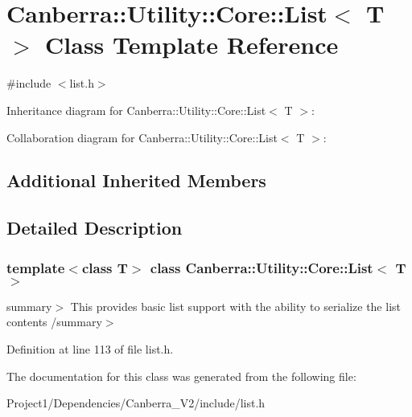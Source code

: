 \hypertarget{class_canberra_1_1_utility_1_1_core_1_1_list}{}\section{Canberra\+:\+:Utility\+:\+:Core\+:\+:List$<$ T $>$ Class Template Reference}
\label{class_canberra_1_1_utility_1_1_core_1_1_list}


{\ttfamily \#include $<$list.\+h$>$}



Inheritance diagram for Canberra\+:\+:Utility\+:\+:Core\+:\+:List$<$ T $>$\+:


Collaboration diagram for Canberra\+:\+:Utility\+:\+:Core\+:\+:List$<$ T $>$\+:
\subsection*{Additional Inherited Members}


\subsection{Detailed Description}
\subsubsection*{template$<$class T$>$\newline
class Canberra\+::\+Utility\+::\+Core\+::\+List$<$ T $>$}

summary$>$ This provides basic list support with the ability to serialize the list contents /summary$>$ 

Definition at line 113 of file list.\+h.



The documentation for this class was generated from the following file\+:\begin{DoxyCompactItemize}
\item 
Project1/\+Dependencies/\+Canberra\+\_\+\+V2/include/list.\+h\end{DoxyCompactItemize}

